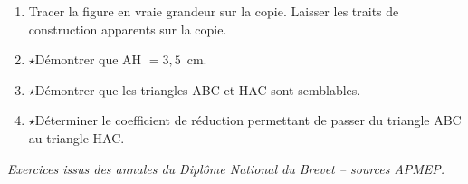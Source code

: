 \documentclass[11pt,a4paper]{article}
\newcommand{\horsprog}{\textbf{\large $\star$}\;}
\begin{document}
\medskip

\begin{enumerate}

\item Tracer la figure en vraie grandeur sur la copie.
Laisser les traits de construction apparents sur la copie.

\item \horsprog Démontrer que AH $= 3,5$~cm.

\item \horsprog Démontrer que les triangles ABC et HAC sont semblables.

\item \horsprog Déterminer le coefficient de réduction permettant
de passer du triangle ABC au triangle HAC.

\end{enumerate}

\vfill

\begin{center}
\small
\textit{Exercices issus des annales du Diplôme National du Brevet --
sources APMEP.}
\end{center}
\end{document}
